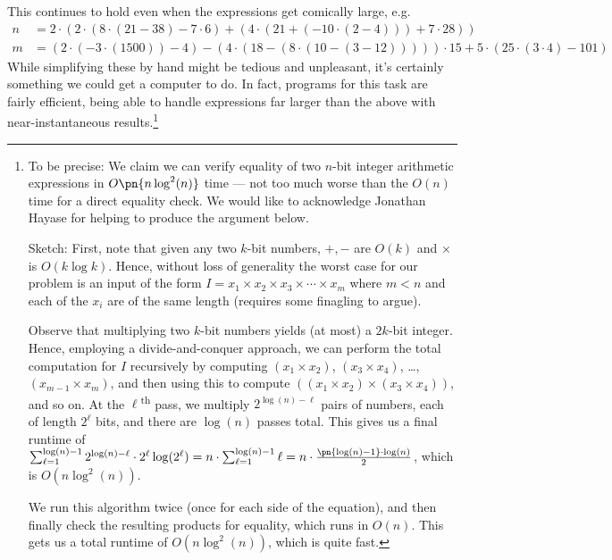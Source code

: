 This continues to hold even when the expressions get comically large,
e.g.
{\footnotesize
\begin{align*}
  n
  &= 2\cdot (2\cdot (8 \cdot  (21 - 38) - 7\cdot 6) + (4\cdot (21 +
    (-10 \cdot  (2 - 4))) + 7\cdot 28)) \\
  m &= (2\cdot(-3 \cdot (1500)) - 4) - (4\cdot(18-(8\cdot(10 - (3 -
      12)))))\cdot 15 + 5 \cdot(25\cdot(3\cdot4) - 101)
\end{align*}}
While simplifying these by hand might be tedious and unpleasant, it's
certainly something we could get a computer to do. In fact, programs
for this task are fairly efficient, being able to handle expressions
far larger than the above with near-instantaneous results.\footnote{To
  be precise: We claim we can verify equality of two $n$-bit integer
  arithmetic expressions in $O\pn{n \log^2(n)}$ time --- not too much
  worse than the $O(n)$ time for a direct equality check. We would
  like to acknowledge Jonathan Hayase for helping to produce the
  argument below.

  Sketch: First, note that given any two $k$-bit numbers, $+, -$ are
  $O(k)$ and $\times$ is $O(k \log k)$. Hence, without loss of
  generality the worst case for our problem is an input of the form $I
  = x_1 \times x_2 \times x_3 \times \cdots \times x_m$ where $m < n$
  and each of the $x_i$ are of the same length (requires some
  finagling to argue).

  Observe that multiplying two $k$-bit numbers yields (at most) a
  $2k$-bit integer. Hence, employing a divide-and-conquer approach, we
  can perform the total computation for $I$ recursively by computing
  $(x_1 \times x_2)$, $(x_3 \times x_4)$, \ldots, $(x_{m-1} \times
  x_m)$, and then using this to compute $((x_1 \times x_2) \times (x_3
  \times x_4))$, and so on. At the $\ell$\textsuperscript{th} pass, we
  multiply $2^{\log(n) - \ell}$ pairs of numbers, each of length
  $2^\ell$ bits, and there are $\log(n)$ passes total. This gives us a
  final runtime of $\sum_{\ell=1}^{\log(n)-1} 2^{\log(n) - \ell} \cdot
  2^{\ell} \log(2^\ell) = n \cdot \sum_{\ell=1}^{\log(n)-1} \ell = n
  \cdot \frac{\pn{\log(n) - 1} \cdot\log(n)}{2}$, which is $O(n
  \log^2(n))$.

  We run this algorithm twice (once for each side of the equation),
  and then finally check the resulting products for equality, which
  runs in $O(n)$. This gets us a total runtime of $O(n \log^2(n))$,
  which is quite fast.}


